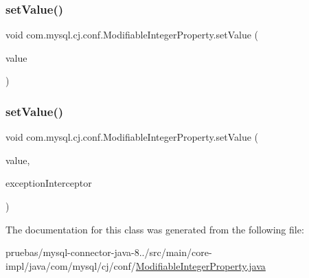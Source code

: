 \subsubsection{\texorpdfstring{set\+Value()}{setValue()}\hspace{0.1cm}{\footnotesize\ttfamily [1/2]}}
{\footnotesize\ttfamily void com.\+mysql.\+cj.\+conf.\+Modifiable\+Integer\+Property.\+set\+Value (\begin{DoxyParamCaption}\item[{Integer}]{value }\end{DoxyParamCaption})}

\mbox{\label{classcom_1_1mysql_1_1cj_1_1conf_1_1_modifiable_integer_property_a894cea497861193a8aae97e09e43f2a0}} 
\subsubsection{\texorpdfstring{set\+Value()}{setValue()}\hspace{0.1cm}{\footnotesize\ttfamily [2/2]}}
{\footnotesize\ttfamily void com.\+mysql.\+cj.\+conf.\+Modifiable\+Integer\+Property.\+set\+Value (\begin{DoxyParamCaption}\item[{Integer}]{value,  }\item[{\mbox{\hyperlink{interfacecom_1_1mysql_1_1cj_1_1exceptions_1_1_exception_interceptor}{Exception\+Interceptor}}}]{exception\+Interceptor }\end{DoxyParamCaption})}



The documentation for this class was generated from the following file\+:\begin{DoxyCompactItemize}
\item 
pruebas/mysql-\/connector-\/java-\/8../src/main/core-\/impl/java/com/mysql/cj/conf/\mbox{\hyperlink{_modifiable_integer_property_8java}{Modifiable\+Integer\+Property.\+java}}\end{DoxyCompactItemize}
